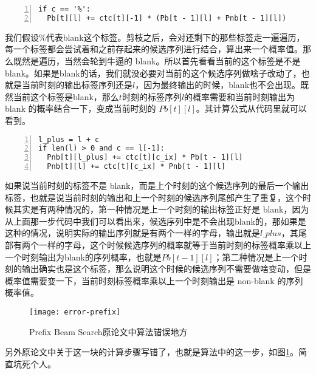 {{\begin{lstlisting}[language = shell, numbers=left, 
         numberstyle=\tiny,keywordstyle=\color{blue!70},
         commentstyle=\color{red!50!green!50!blue!50},frame=shadowbox,
         rulesepcolor=\color{red!20!green!20!blue!20},basicstyle=\ttfamily]
if c == '%':
  Pb[t][l] += ctc[t][-1] * (Pb[t - 1][l] + Pnb[t - 1][l])
\end{lstlisting}

我们假设$\%$代表blank这个标签。剪枝之后，会对还剩下的那些标签走一遍遍历，每一个标签都会尝试着和之前存起来的候选序列进行结合，算出来一个概率值。那么既然是遍历，当然会轮到牛逼的 blank。所以首先看看当前的这个标签是不是blank。如果是blank的话，我们就没必要对当前的这个候选序列做啥子改动了，也就是当前时刻的输出标签序列还是$l$，因为最终输出的时候，blank也不会出现。既然当前这个标签是blank，那么$t$时刻的标签序列$l$的概率需要和当前时刻输出为 blank 的概率结合一下，变成当前时刻的 $Pb[t][l]$。其计算公式从代码里就可以看到。

\begin{lstlisting}[language = shell, numbers=left, 
         numberstyle=\tiny,keywordstyle=\color{blue!70},
         commentstyle=\color{red!50!green!50!blue!50},frame=shadowbox,
         rulesepcolor=\color{red!20!green!20!blue!20},basicstyle=\ttfamily]
l_plus = l + c
if len(l) > 0 and c == l[-1]:
  Pnb[t][l_plus] += ctc[t][c_ix] * Pb[t - 1][l]
  Pnb[t][l] += ctc[t][c_ix] * Pnb[t - 1][l]
\end{lstlisting}

如果说当前时刻的标签不是 blank，而是上个时刻的这个候选序列的最后一个输出标签，也就是说当前时刻的输出和上一个时刻的候选序列尾部产生了重复，这个时候其实是有两种情况的，第一种情况是上一个时刻的输出标签正好是 blank，因为从上面那一步代码中我们可以看出来，候选序列中是不会出现blank的，那如果是这种的情况，说明实际的输出序列就是有两个一样的字母，输出就是$l\_plus$，其尾部有两个一样的字母，这个时候候选序列的概率就等于当前时刻的标签概率乘以上一个时刻输出为blank的序列概率，也就是$Pb[t - 1][l]$；第二种情况是上一个时刻的输出确实也是这个标签，那么说明这个时候的候选序列不需要做啥变动，但是概率值需要变一下，当前时刻标签概率乘以上一个时刻输出是 non-blank 的序列概率值。

\begin{figure}[h]
  \centering
  \texttt{[image: error-prefix]}
  \caption{Prefix Beam Search原论文中算法错误地方 \label{fig:error-prefix}}
\end{figure}

另外原论文中关于这一块的计算步骤写错了，也就是算法中的这一步，如图\ref{fig:error-prefix}。简直坑死个人。

}}
